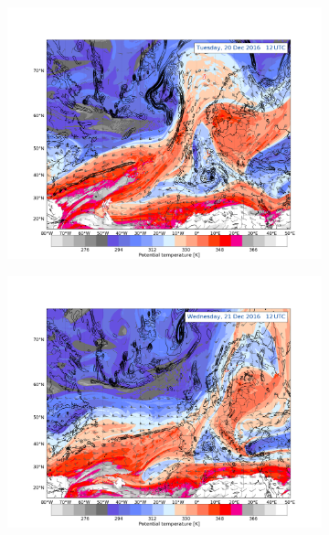 \begin{figure}[h!]
    \centering
    \begin{subfigure}[b]{0.49\textwidth}
        \includegraphics[trim={4.2cm 3.9cm 4.3cm 5.1cm},clip,
        width=\textwidth]{./fig_DynTropo/20161220_12}
        \caption{} \label{fig:DT20}
    \end{subfigure}
    \begin{subfigure}[b]{0.49\textwidth}
        \includegraphics[trim={4.2cm 3.9cm 4.3cm 5.1cm},clip,
        width=\textwidth]{./fig_DynTropo/20161221_12}
        \caption{}\label{fig:DT21}
    \end{subfigure}


\end{figure}

